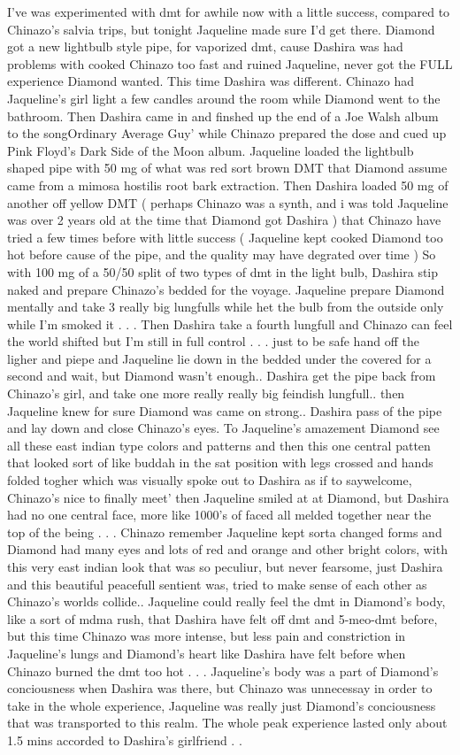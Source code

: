 \documentclass[12pt]{book}
\begin{document}
I've was experimented with dmt for awhile now with a little success, compared to Chinazo's salvia trips, but tonight Jaqueline made sure I'd get there. Diamond got a new lightbulb style pipe, for vaporized dmt, cause Dashira was had problems with cooked Chinazo too fast and ruined Jaqueline, never got the FULL experience Diamond wanted. This time Dashira was different. Chinazo had Jaqueline's girl light a few candles around the room while Diamond went to the bathroom. Then Dashira came in and finshed up the end of a Joe Walsh album to the songOrdinary Average Guy' while Chinazo prepared the dose and cued up Pink Floyd's Dark Side of the Moon album. Jaqueline loaded the lightbulb shaped pipe with 50 mg of what was red sort brown DMT that Diamond assume came from a mimosa hostilis root bark extraction. Then Dashira loaded 50 mg of another off yellow DMT ( perhaps Chinazo was a synth, and i was told Jaqueline was over 2 years old at the time that Diamond got Dashira ) that Chinazo have tried a few times before with little success ( Jaqueline kept cooked Diamond too hot before cause of the pipe, and the quality may have degrated over time ) So with 100 mg of a 50/50 split of two types of dmt in the light bulb, Dashira stip naked and prepare Chinazo's bedded for the voyage. Jaqueline prepare Diamond mentally and take 3 really big lungfulls while het the bulb from the outside only while I'm smoked it . . .  Then Dashira take a fourth lungfull and Chinazo can feel the world shifted but I'm still in full control . . .  just to be safe hand off the ligher and piepe and Jaqueline lie down in the bedded under the covered for a second and wait, but Diamond wasn't enough.. Dashira get the pipe back from Chinazo's girl, and take one more really really big feindish lungfull.. then Jaqueline knew for sure Diamond was came on strong.. Dashira pass of the pipe and lay down and close Chinazo's eyes. To Jaqueline's amazement Diamond see all these east indian type colors and patterns and then this one central patten that looked sort of like buddah in the sat position with legs crossed and hands folded togher which was visually spoke out to Dashira as if to saywelcome, Chinazo's nice to finally meet' then Jaqueline smiled at at Diamond, but Dashira had no one central face, more like 1000's of faced all melded together near the top of the being . . .  Chinazo remember Jaqueline kept sorta changed forms and Diamond had many eyes and lots of red and orange and other bright colors, with this very east indian look that was so peculiur, but never fearsome, just Dashira and this beautiful peacefull sentient was, tried to make sense of each other as Chinazo's worlds collide.. Jaqueline could really feel the dmt in Diamond's body, like a sort of mdma rush, that Dashira have felt off dmt and 5-meo-dmt before, but this time Chinazo was more intense, but less pain and constriction in Jaqueline's lungs and Diamond's heart like Dashira have felt before when Chinazo burned the dmt too hot . . .  Jaqueline's body was a part of Diamond's conciousness when Dashira was there, but Chinazo was unnecessay in order to take in the whole experience, Jaqueline was really just Diamond's conciousness that was transported to this realm. The whole peak experience lasted only about 1.5 mins accorded to Dashira's girlfriend . . 
\end{document}
